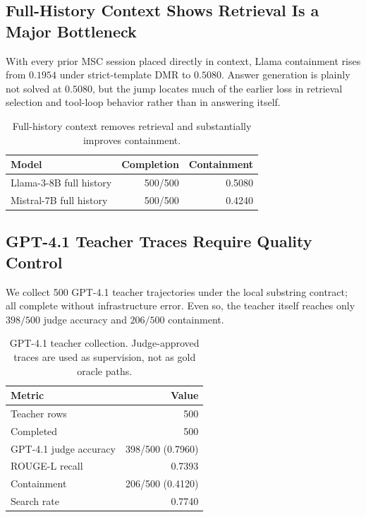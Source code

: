 \documentclass[11pt]{article}
\begin{document}
\subsection{Full-History Context Shows Retrieval Is a Major Bottleneck}

With every prior MSC session placed directly in context, Llama containment rises from $0.1954$ under strict-template DMR to $0.5080$. Answer generation is plainly not solved at $0.5080$, but the jump locates much of the earlier loss in retrieval selection and tool-loop behavior rather than in answering itself.

\begin{table}[t]
\centering
\small
\begin{tabular}{lrr}
\toprule
\textbf{Model} & \textbf{Completion} & \textbf{Containment} \\
\midrule
Llama-3-8B full history & 500/500 & 0.5080 \\
Mistral-7B full history & 500/500 & 0.4240 \\
\bottomrule
\end{tabular}
\caption{Full-history context removes retrieval and substantially improves containment.}
\label{tab:fullhistory}
\end{table}

\subsection{GPT-4.1 Teacher Traces Require Quality Control}

We collect 500 GPT-4.1 teacher trajectories under the local substring contract; all complete without infrastructure error. Even so, the teacher itself reaches only $398/500$ judge accuracy and $206/500$ containment.

\begin{table}[t]
\centering
\small
\begin{tabular}{lr}
\toprule
\textbf{Metric} & \textbf{Value} \\
\midrule
Teacher rows & 500 \\
Completed & 500 \\
GPT-4.1 judge accuracy & 398/500 (0.7960) \\
ROUGE-L recall & 0.7393 \\
Containment & 206/500 (0.4120) \\
Search rate & 0.7740 \\
\bottomrule
\end{tabular}
\caption{GPT-4.1 teacher collection. Judge-approved traces are used as supervision, not as gold oracle paths.}
\label{tab:teacher}
\end{table}
\end{document}
